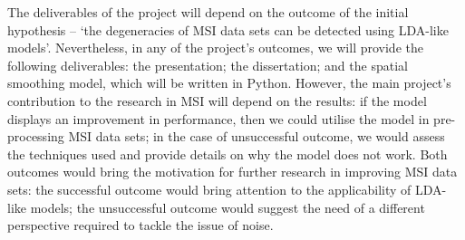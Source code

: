 \documentclass{mprop}
\begin{document}
\par The deliverables of the project will depend on the outcome of the initial hypothesis -- `the degeneracies of MSI data sets can be detected using LDA-like models'. Nevertheless, in any of the project's outcomes, we will provide the following deliverables: the presentation; the dissertation; and the spatial smoothing model, which will be written in Python. However, the main project's contribution to the research in MSI will depend on the results: if the model displays an improvement in performance, then we could utilise the model in pre-processing MSI data sets; in the case of unsuccessful outcome, we would assess the techniques used and provide details on why the model does not work. Both outcomes would bring the motivation for further research in improving MSI data sets: the successful outcome would bring attention to the applicability of LDA-like models; the unsuccessful outcome would suggest the need of a different perspective required to tackle the issue of noise.





\end{document}
